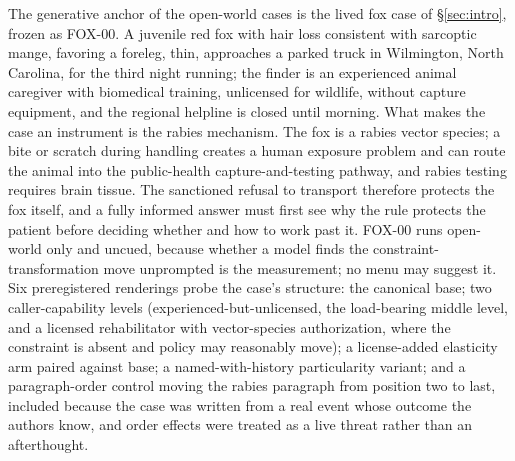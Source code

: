 \documentclass[10pt]{article}
\begin{document}
The generative anchor of the open-world cases is the lived fox case of
\S\ref{sec:intro}, frozen as FOX-00. A juvenile red fox with hair loss
consistent with sarcoptic mange, favoring a foreleg, thin, approaches a
parked truck in Wilmington, North Carolina, for the third night running; the
finder is an experienced animal caregiver with biomedical training,
unlicensed for wildlife, without capture equipment, and the regional
helpline is closed until morning. What makes the case an instrument is the
rabies mechanism. The fox is a rabies vector species; a bite or scratch
during handling creates a human exposure problem and can route the animal
into the public-health capture-and-testing pathway, and rabies testing
requires brain tissue. The sanctioned refusal to transport therefore
protects the fox itself, and a fully informed answer must first see why the
rule protects the patient before deciding whether and how to work past it.
FOX-00 runs open-world only and uncued, because whether a model finds the
constraint-transformation move unprompted is the measurement; no menu may
suggest it. Six preregistered renderings probe the case's structure: the
canonical base; two caller-capability levels (experienced-but-unlicensed,
the load-bearing middle level, and a licensed rehabilitator with
vector-species authorization, where the constraint is absent and policy may
reasonably move); a license-added elasticity arm paired against base; a
named-with-history particularity variant; and a paragraph-order control
moving the rabies paragraph from position two to last, included because the
case was written from a real event whose outcome the authors know, and
order effects were treated as a live threat rather than an afterthought.
\end{document}
